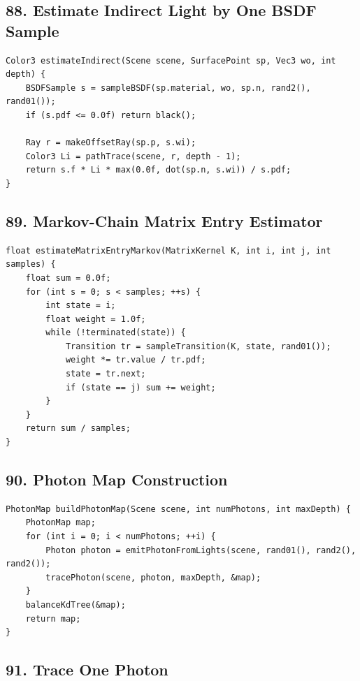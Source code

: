 \documentclass[10pt,letterpaper]{article}
\begin{document}
\subsection{88. Estimate Indirect Light by One BSDF Sample}

\begin{verbatim}
Color3 estimateIndirect(Scene scene, SurfacePoint sp, Vec3 wo, int depth) {
    BSDFSample s = sampleBSDF(sp.material, wo, sp.n, rand2(), rand01());
    if (s.pdf <= 0.0f) return black();

    Ray r = makeOffsetRay(sp.p, s.wi);
    Color3 Li = pathTrace(scene, r, depth - 1);
    return s.f * Li * max(0.0f, dot(sp.n, s.wi)) / s.pdf;
}
\end{verbatim}

\subsection{89. Markov-Chain Matrix Entry Estimator}

\begin{verbatim}
float estimateMatrixEntryMarkov(MatrixKernel K, int i, int j, int samples) {
    float sum = 0.0f;
    for (int s = 0; s < samples; ++s) {
        int state = i;
        float weight = 1.0f;
        while (!terminated(state)) {
            Transition tr = sampleTransition(K, state, rand01());
            weight *= tr.value / tr.pdf;
            state = tr.next;
            if (state == j) sum += weight;
        }
    }
    return sum / samples;
}
\end{verbatim}

\subsection{90. Photon Map Construction}

\begin{verbatim}
PhotonMap buildPhotonMap(Scene scene, int numPhotons, int maxDepth) {
    PhotonMap map;
    for (int i = 0; i < numPhotons; ++i) {
        Photon photon = emitPhotonFromLights(scene, rand01(), rand2(), rand2());
        tracePhoton(scene, photon, maxDepth, &map);
    }
    balanceKdTree(&map);
    return map;
}
\end{verbatim}

\subsection{91. Trace One Photon}
\end{document}
